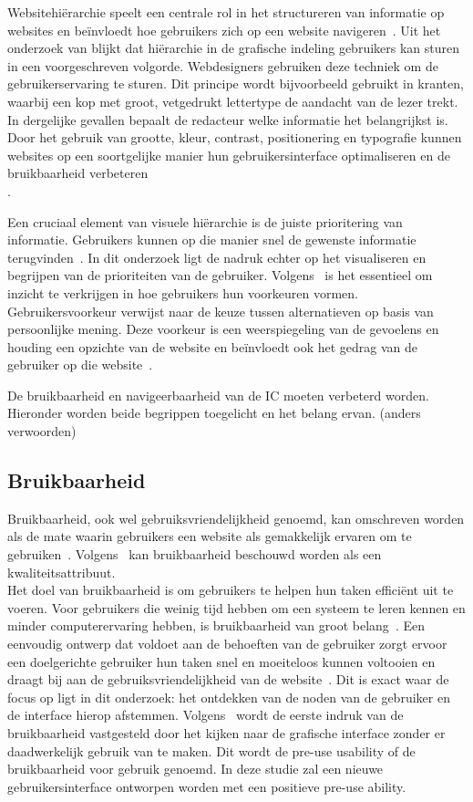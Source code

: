 Websitehiërarchie speelt een centrale rol in het structureren van informatie op websites en beïnvloedt hoe gebruikers zich op een website navigeren~\autocite{Djonov2007}. Uit het onderzoek van \textcite{Urano2021} blijkt dat hiërarchie in de grafische indeling gebruikers kan sturen in een voorgeschreven volgorde. Webdesigners gebruiken deze techniek om de gebruikerservaring te sturen. Dit principe wordt bijvoorbeeld gebruikt in kranten, waarbij een kop met groot, vetgedrukt lettertype de aandacht van de lezer trekt. In dergelijke gevallen bepaalt de redacteur welke informatie het belangrijkst is. Door het gebruik van grootte, kleur, contrast, positionering en typografie kunnen websites op een soortgelijke manier hun gebruikersinterface optimaliseren en de bruikbaarheid verbeteren\\\autocite{Raghavendra2024}.

Een cruciaal element van visuele hiërarchie is de juiste prioritering van informatie. Gebruikers kunnen op die manier snel de gewenste informatie terugvinden~\autocite{Raghavendra2024}. In dit onderzoek ligt de nadruk echter op het visualiseren en begrijpen van de prioriteiten van de gebruiker. Volgens~\textcite{Lee2010} is het essentieel om inzicht te verkrijgen in hoe gebruikers hun voorkeuren vormen. Gebruikersvoorkeur verwijst naar de keuze tussen alternatieven op basis van persoonlijke mening. Deze voorkeur is een weerspiegeling van de gevoelens en houding een opzichte van de website en beïnvloedt ook het gedrag van de gebruiker op die website~\autocite{Lee2010}.

De bruikbaarheid en navigeerbaarheid van de IC moeten verbeterd worden. Hieronder worden beide begrippen toegelicht en het belang ervan. (anders verwoorden)
\subsection{Bruikbaarheid}
Bruikbaarheid, ook wel gebruiksvriendelijkhe\-id genoemd, kan omschreven worden als de mate waarin gebruikers een website als gemakkelijk ervaren om te gebruiken~\autocite{Dianat2019}. Volgens~\textcite{Dingli2014} kan bruikbaarheid beschouwd worden als een kwaliteitsattribuut.\\Het doel van bruikbaarheid is om gebruikers te helpen hun taken efficiënt uit te voeren. Voor gebruikers die weinig tijd hebben om een systeem te leren kennen en minder computerervaring hebben, is bruikbaarheid van groot belang~\autocite{Mazumder2014}. Een eenvoudig ontwerp dat voldoet aan de behoeften van de gebruiker zorgt ervoor een doelgerichte gebruiker hun taken snel en moeiteloos kunnen voltooien en draagt bij aan de gebruiksvriendelijkheid van de website~\autocite{Pearson2007}. Dit is exact waar de focus op ligt in dit onderzoek: het ontdekken van de noden van de gebruiker en de interface hierop afstemmen. Volgens~\textcite{Zachrison2022} wordt de eerste indruk van de bruikbaarheid vastgesteld door het kijken naar de grafische interface zonder er daadwerkelijk gebruik van te maken. Dit wordt de pre-use usability of de bruikbaarheid voor gebruik genoemd. In deze studie zal een nieuwe gebruikersinterface ontworpen worden met een positieve pre-use ability.

